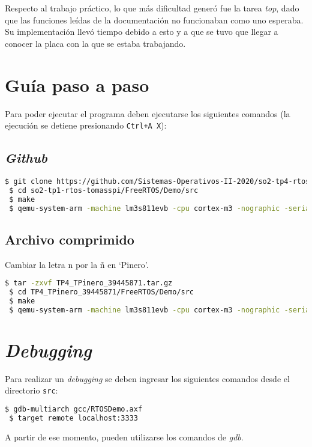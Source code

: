 \documentclass[12pt,a4paper]{article}
\begin{document}
Respecto al trabajo práctico, lo que más dificultad generó fue la tarea \emph{top},
dado que las funciones leídas de la documentación no funcionaban como uno
esperaba. Su implementación llevó tiempo debido a esto y a que se tuvo que
llegar a conocer la placa con la que se estaba trabajando.

\newpage
\begin{appendices}
\section{Guía paso a paso}
\label{app:howto}

Para poder ejecutar el programa deben ejecutarse los siguientes comandos
(la ejecución se detiene presionando \texttt{Ctrl+A X}):

\subsection{\emph{Github}}
\label{git}

\begin{lstlisting}[breaklines,language=bash,basicstyle=\ttfamily\color{white}]
 $ git clone https://github.com/Sistemas-Operativos-II-2020/so2-tp4-rtos-tomasspi.git
 $ cd so2-tp1-rtos-tomasspi/FreeRTOS/Demo/src
 $ make
 $ qemu-system-arm -machine lm3s811evb -cpu cortex-m3 -nographic -serial mon:stdio -kernel gcc/RTOSDemo.axf -gdb tcp::3333
\end{lstlisting}

\subsection{Archivo comprimido}
\label{tar}

Cambiar la letra n por la ñ en `Pinero'.

\begin{lstlisting}[breaklines,language=bash,basicstyle=\ttfamily\color{white}]
 $ tar -zxvf TP4_TPinero_39445871.tar.gz
 $ cd TP4_TPinero_39445871/FreeRTOS/Demo/src
 $ make
 $ qemu-system-arm -machine lm3s811evb -cpu cortex-m3 -nographic -serial mon:stdio -kernel gcc/RTOSDemo.axf -gdb tcp::3333
\end{lstlisting}

\section{\emph{Debugging}}
\label{debug}
Para realizar un \emph{debugging} se deben ingresar los siguientes comandos
desde el directorio \verb|src|:

\begin{lstlisting}[breaklines,language=bash,basicstyle=\ttfamily\color{white}]
 $ gdb-multiarch gcc/RTOSDemo.axf
 $ target remote localhost:3333
\end{lstlisting}

A partir de ese momento, pueden utilizarse los comandos de \emph{gdb}\cite{cheat}.
\end{appendices}
\end{document}
